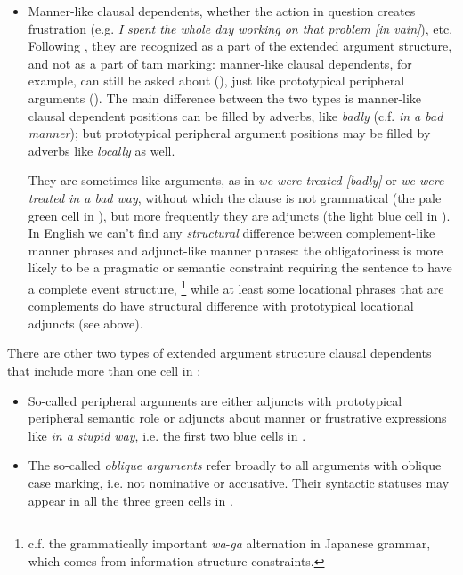 \documentclass[UTF8, a4paper, oneside, scheme=plain, 12pt]{ctexbook}
\newcommand*{\citesec}[1]{\S~{#1}}
\newcommand*{\term}[1]{\emph{#1}}
\newcommand{\form}[1]{\emph{#1}}
\begin{document}
\begin{itemize}
    \item Manner-like clausal dependents, whether the action in question creates frustration 
    (e.g. \form{I spent the whole day working on that problem [in vain]}), etc.
    Following \citet[\citesec{1.5}]{cinque1999adverbs}, 
    they are recognized as a part of the extended argument structure, 
    and not as a part of \acs{tam} marking:
    manner-like clausal dependents, for example,  
    can still be asked about (), 
    just like prototypical peripheral arguments (). 
    The main difference between the two types 
    is manner-like clausal dependent positions can be filled by adverbs, like 
    \form{badly} (c.f. \form{in a bad manner});
    but prototypical peripheral argument positions may be filled 
    by adverbs like \form{locally} as well.

    They are sometimes like arguments, 
    as in \form{we were treated [badly]} or \form{we were treated in a bad way},
    without which the clause is not grammatical
    (the pale green cell in ),
    but more frequently they are adjuncts
    (the light blue cell in ).
    In English we can't find any \emph{structural} difference 
    between complement-like manner phrases and adjunct-like manner phrases: 
    the obligatoriness is more likely to be a pragmatic or semantic constraint 
    requiring the sentence to have a complete event structure,%
    \footnote{
        c.f. the grammatically important \form{wa}-\form{ga} alternation in Japanese grammar, 
        which comes from information structure constraints. 
    }
    while at least some locational phrases that are complements 
    do have structural difference with prototypical locational adjuncts (see above).
\end{itemize}

There are other two types of extended argument structure clausal dependents 
that include more than one cell in :
\begin{itemize}
    \item So-called peripheral arguments
    are either adjuncts with prototypical peripheral semantic role
    or adjuncts about manner or frustrative expressions like \form{in a stupid way},
    i.e. the first two blue cells in .

    \item The so-called \term{oblique arguments}
    refer broadly to all arguments with oblique case marking, i.e. not nominative or accusative.
    Their syntactic statuses may appear in 
    all the three green cells in .
\end{itemize}
\end{document}
